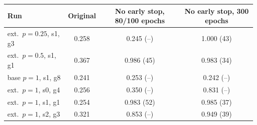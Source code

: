 \begin{tabular}{@{}lccc@{}}
\toprule
Run & Original & No early stop, 80/100 epochs & No early stop, 300 epochs\\
\midrule
ext.\ $p{=}0.25$, s1, g3 & 0.258 & 0.245 (--) & 1.000 (43) \\
ext.\ $p{=}0.5$, s1, g1 & 0.367 & 0.986 (45) & 0.983 (34) \\
base $p{=}1$, s1, g8 & 0.241 & 0.253 (--) & 0.242 (--) \\
ext.\ $p{=}1$, s0, g4 & 0.256 & 0.350 (--) & 0.831 (--) \\
ext.\ $p{=}1$, s1, g1 & 0.254 & 0.983 (52) & 0.985 (37) \\
ext.\ $p{=}1$, s2, g3 & 0.321 & 0.853 (--) & 0.949 (39) \\
\bottomrule
\end{tabular}
